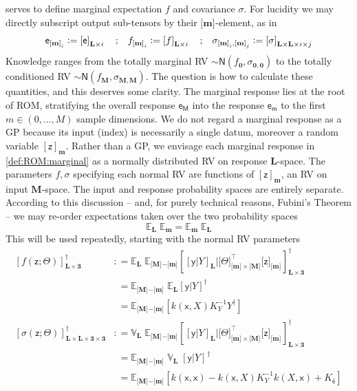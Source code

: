 \documentclass[preprint,12pt]{elsarticle}
\newcommand*{\M}[1]{\ensuremath{#1}\xspace}
\newcommand*{\x}{\times}
\newcommand*{\mi}[1]{\mathbf{#1}}
\newcommand*{\rv}[1]{\mathsf{#1}}
\newcommand*{\te}[2][]{\left\lbrack{#2}\right\rbrack_{#1}}
\newcommand*{\tte}[2][]{\lbrack{#2}\rbrack_{#1}}
\newcommand*{\tse}[2][]{\mi{\lbrack#2\rbrack}_{#1}}
\newcommand*{\tme}[3][]{\lbrack{#3}\rbrack_{\tse[#1]{#2}}}
\newcommand*{\deq}{\M{\mathrel{\mathop:}=}}
\newcommand{\T}[1]{\text{#1}}
\newcommand*{\QT}[2][]{\M{\quad\T{#2}\ifthenelse{\equal{#1}{}}{\quad}{#1}}}
\newcommand*{\evt}[3][]{\mathbb{E}_{#3}^{#1}\!#2}
\newcommand*{\covt}[2]{\mathbb{V}_{#2}\!{#1}}
\newcommand*{\tgauss}[2]{\mathsf{N}({#1,#2})}
\begin{document}
    serves to define marginal expectation $f$ and covariance $\sigma$.
    For lucidity we may directly subscript output sub-tensors by their $\tse{m}$-element, as in
    \begin{equation*}
        {\rv{e}_{\tse[i]{m}}}\deq \te[\mi{L}\x i]{\rv{e}} \QT{;}
        {f_{\tse[i]{m}}}\deq \te[\mi{L}\x i]{f} \QT{;}
        {\sigma_{\tse[i]{m},\tse[j]{m}}}\deq \te[\mi{L}\x\mi{L}\x i\x j]{\sigma}
    \end{equation*}
    Knowledge ranges from the totally marginal RV $\sim \tgauss{f_{\mi{0}}}
    {\sigma_{\mi{0},\mi{0}}}$ to the totally conditioned RV $\sim \tgauss{f_{\mi{M}}}{\sigma_{\mi{M},\mi{M}}}$. The question is how to calculate these quantities, and this deserves some clarity.
    The marginal response lies at the root of ROM, stratifying the overall response $\rv{e_{M}}$ into the response $\rv{e_{m}}$ to the first $m \in (0,\ldots,M)$ sample dimensions. We do not regard a marginal response as a GP because its input (index) is necessarily a single datum, moreover a random variable $\te[\mi{m}]{\rv{z}}$. Rather than a GP, we envisage each marginal response in \cref{def:ROM:marginal} as a normally distributed RV on response $\mi{L}$-space. The parameters $f,\sigma$ specifying each normal RV are functions of $\te[\mi{m}]{\rv{z}}$, an RV on input $\mi{M}$-space. The input and response probability spaces are entirely separate.
    According to this discussion -- and, for purely technical reasons, Fubini's Theorem -- we may re-order expectations taken over the two probability spaces
    \begin{equation*}
        \evt{\;\evt{}{\mi{m}}}{\mi{L}} = \evt{\;\evt{}{\mi{L}}}{\mi{m}}
    \end{equation*}
    This will be used repeatedly, starting with the normal RV parameters
    \begin{equation*}
        \begin{aligned}
            \te[\mi{L\x 3}]{f({\rv{z}}; \Theta)}^{\dagger} &\deq
            \evt{\;\evt{\te[\mi{L\x 3}]{\te[\mi{L}]{\rv{y} \vert Y} 
            \big\vert \tte[\tse{m}\x\tse{M}]{\Theta}^{\intercal} \tme{m}{\rv{z}}}}{\tse{M}\mi{-}\tse{m}}^{\dagger}}{\mi{L}} \\
            &\phantom{:}= \evt{\;\evt{\te{\rv{y} \vert Y}}{\mi{L}}^{\dagger}}{\tse{M}\mi{-}\tse{m}} \\
            &\phantom{:}= \evt{\te{k(\rv{x},X) K_{Y}^{-1} Y^{\dagger}}}{\tse{M}\mi{-}\tse{m}} \\
            \te[\mi{L\x L\x 3\x 3}]{\sigma({\rv{z}}; \Theta)}^{\dagger} &\deq
            \covt{\;\evt{\te[\mi{L\x 3}]{\te[\mi{L}]{\rv{y} \vert Y} 
            \big\vert \tte[\tse{m}\x\tse{M}]{\Theta}^{\intercal} \tme{m}{\rv{z}}}}{\tse{M}\mi{-}\tse{m}}^{\dagger}}{\mi{L}} \\
            &\phantom{:}= \evt{\;\covt{\;\te{\rv{y} \vert Y}}{\mi{L}}^{\dagger}}{\tse{M}\mi{-}\tse{m}} \\
            &\phantom{:}= \evt{\te{k(\rv{x},\rv{x}) - k(\rv{x},X) K_{Y}^{-1} k(X,\rv{x}) 
            + K_{\rv{\hat{e}}}}}{\tse{M}\mi{-}\tse{m}}
        \end{aligned}                    
    \end{equation*}
\end{document}
